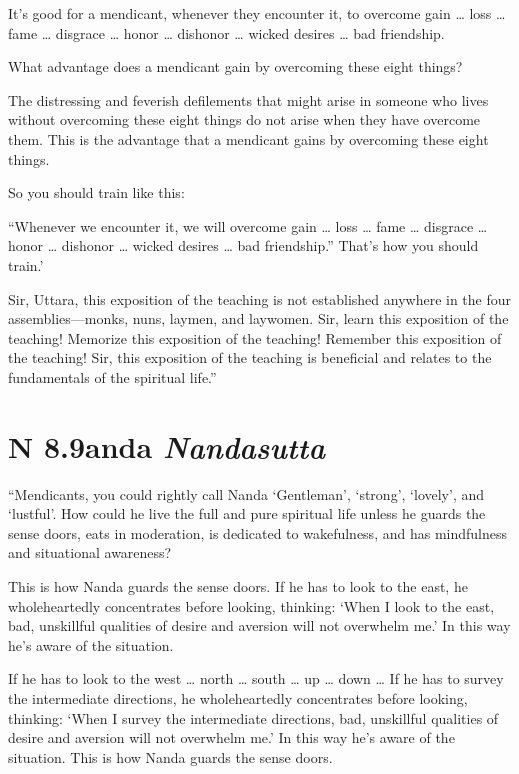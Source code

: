 \documentclass[12pt,openany]{book}%
\newcommand*{\suttatitleacronym}[1]{\smaller[2]{#1}\vspace*{.3em}}
\newcommand*{\suttatitletranslation}[1]{\linebreak{#1}}
\newcommand*{\suttatitleroot}[1]{\linebreak\smaller[2]\itshape{#1}}
\newcommand*{\tocacronym}[1]{\hspace*{-3.3em}{#1}\quad}
\newcommand*{\toctranslation}[1]{#1}
\newcommand*{\tocroot}[1]{(\textit{#1})}
\begin{document}
It’s good for a mendicant, whenever they encounter it, to overcome gain … loss … fame … disgrace … honor … dishonor … wicked desires … bad friendship. 

What advantage does a mendicant gain by overcoming these eight things? 

The distressing and feverish defilements that might arise in someone who lives without overcoming these eight things do not arise when they have overcome them. This is the advantage that a mendicant gains by overcoming these eight things. 

So you should train like this: 

“Whenever we encounter it, we will overcome gain … loss … fame … disgrace … honor … dishonor … wicked desires … bad friendship.” That’s how you should train.’ 

Sir, Uttara, this exposition of the teaching is not established anywhere in the four assemblies—monks, nuns, laymen, and laywomen. Sir, learn this exposition of the teaching! Memorize this exposition of the teaching! Remember this exposition of the teaching! Sir, this exposition of the teaching is beneficial and relates to the fundamentals of the spiritual life.” 

%
\section*{{\suttatitleacronym AN 8.9}{\suttatitletranslation Nanda }{\suttatitleroot Nandasutta}}
\addcontentsline{toc}{section}{\tocacronym{AN 8.9} \toctranslation{Nanda } \tocroot{Nandasutta}}

“Mendicants, you could rightly call Nanda ‘Gentleman’, ‘strong’, ‘lovely’, and ‘lustful’. How could he live the full and pure spiritual life unless he guards the sense doors, eats in moderation, is dedicated to wakefulness, and has mindfulness and situational awareness? 

This is how Nanda guards the sense doors. If he has to look to the east, he wholeheartedly concentrates before looking, thinking: ‘When I look to the east, bad, unskillful qualities of desire and aversion will not overwhelm me.’ In this way he’s aware of the situation. 

If he has to look to the west … north … south … up … down … If he has to survey the intermediate directions, he wholeheartedly concentrates before looking, thinking: ‘When I survey the intermediate directions, bad, unskillful qualities of desire and aversion will not overwhelm me.’ In this way he’s aware of the situation. This is how Nanda guards the sense doors. 
\end{document}
